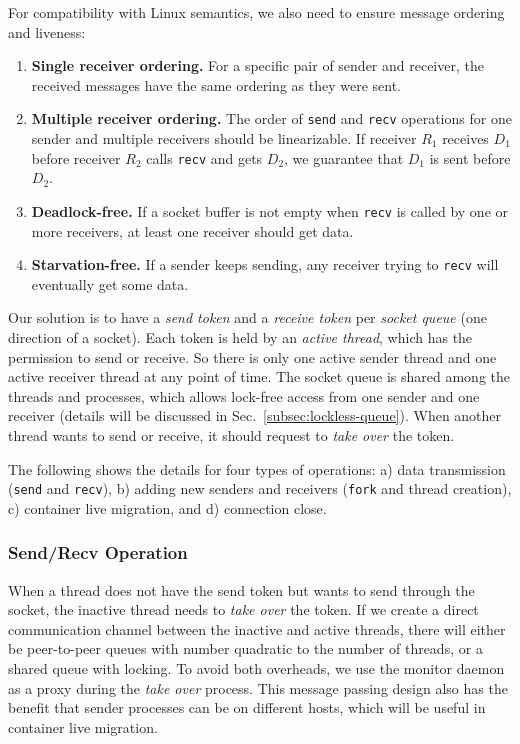 For compatibility with Linux semantics, we also need to ensure message ordering and liveness:
\begin{enumerate}
\item \textbf{Single receiver ordering.} For a specific pair of sender and receiver, the received messages have the same ordering as they were sent.
\item \textbf{Multiple receiver ordering.} The order of \texttt{send} and \texttt{recv} operations for one sender and multiple receivers should be linearizable. If receiver $R_1$ receives $D_1$ before receiver $R_2$ calls \texttt{recv} and gets $D_2$, we guarantee that $D_1$ is sent before $D_2$.
\item \textbf{Deadlock-free.} If a socket buffer is not empty when \texttt{recv} is called by one or more receivers, at least one receiver should get data.
\item \textbf{Starvation-free.} If a sender keeps sending, any receiver trying to \texttt{recv} will eventually get some data.
\end{enumerate}
\fi

Our solution is to have a \emph{send token} and a \emph{receive token} per \emph{socket queue} (one direction of a socket).
Each token is held by an \emph{active thread}, which has the permission to send or receive.
So there is only one active sender thread and one active receiver thread at any point of time.
The socket queue is shared among the threads and processes, which allows lock-free access from one sender and one receiver (details will be discussed in Sec.~\ref{subsec:lockless-queue}).
When another thread wants to send or receive, it should request to \emph{take over} the token.

The following shows the details for four types of operations: a) data transmission (\texttt{send} and \texttt{recv}), b) adding new senders and receivers (\texttt{fork} and thread creation), c) container live migration, and d) connection close.

\subsubsection{Send/Recv Operation}
\label{subsubsec:fork_rdwr}
\quad

When a thread does not have the send token but wants to send through the socket, the inactive thread needs to \emph{take over} the token.
If we create a direct communication channel between the inactive and active threads, there will either be peer-to-peer queues with number quadratic to the number of threads, or a shared queue with locking.
To avoid both overheads, we use the monitor daemon as a proxy during the \emph{take over} process.
This message passing design also has the benefit that sender processes can be on different hosts, which will be useful in container live migration.

